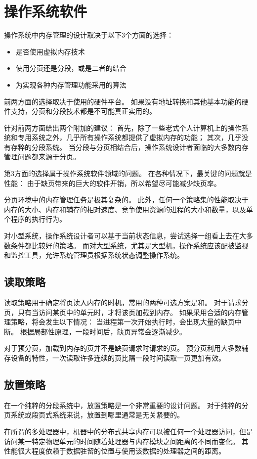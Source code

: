 
\section{操作系统软件}
{
    操作系统中内存管理的设计取决于以下3个方面的选择：

    \begin{itemize}
        \item 是否使用虚拟内存技术
        \item 使用分页还是分段，或是二者的结合
        \item 为实现各种内存管理功能采用的算法
    \end{itemize}

    前两方面的选择取决于使用的硬件平台。
    如果没有地址转换和其他基本功能的硬件支持，分页和分段技术都是不可能真正实用的。

    针对前两方面给出两个附加的建议：
    首先，除了一些老式个人计算机上的操作系统和专用系统之外，几乎所有操作系统都提供了虚拟内存的功能；
    其次，几乎没有存粹的分段系统。
    当分段与分页相结合后，操作系统设计者面临的大多数内存管理问题都来源于分页。

    第3方面的选择属于操作系统软件领域的问题。
    在各种情况下，最关键的问题就是性能：
    由于缺页带来的巨大的软件开销，所以希望尽可能减少缺页率。

    分页环境中的内存管理任务是极其复杂的。
    此外，任何一个策略集的性能取决于内存的大小、内存和辅存的相对速度、竞争使用资源的进程的大小和数量，以及单个程序的执行行为。

    对小型系统，操作系统设计者可以基于当前状态信息，尝试选择一组看上去在大多数条件都比较好的策略。
    而对大型系统，尤其是大型机，操作系统应该配被监视和监控工具，允许系统管理员根据系统状态调整操作系统。

    \subsection{读取策略}
    {
        读取策略用于确定将页读入内存的时机，常用的两种可选方案是和。
        对于请求分页，只有当访问某页中的单元时，才将该页加载到内存。
        如果采用合适的内存管理策略，将会发生以下情况：
        当进程第一次开始执行时，会出现大量的缺页中断。
        根据局部性原理，一段时间后，缺页异常会逐渐减少。

        对于预分页，加载到内存的页并不是缺页请求时请求的页。
        预分页利用大多数辅存设备的特性，一次读取许多连续的页比隔一段时间读取一页更加有效。
    }

    \subsection{放置策略}
    {
        在一个纯粹的分段系统中，放置策略是一个非常重要的设计问题。
        对于纯粹的分页系统或段页式系统来说，放置到哪里通常是无关紧要的。

        在所谓的多处理器中，机器中的分布式共享内存可以被任何一个处理器访问，但是访问某一特定物理单元的时间随着处理器与内存模块之间距离的不同而变化。
        其性能很大程度依赖于数据驻留的位置与使用该数据的处理器之间的距离。
    }
}

